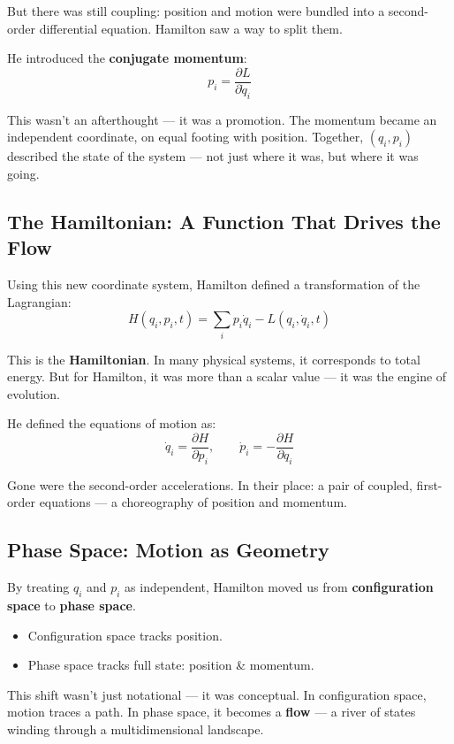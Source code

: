 But there was still coupling: position and motion were bundled into a second-order differential equation. Hamilton saw a way to split them.

He introduced the \textbf{conjugate momentum}:
\[
p_i = \frac{\partial L}{\partial \dot{q}_i}
\]

This wasn’t an afterthought — it was a promotion. The momentum became an independent coordinate, on equal footing with position.  
Together, \( (q_i, p_i) \) described the state of the system — not just where it was, but where it was going.

\subsection{The Hamiltonian: A Function That Drives the Flow}

Using this new coordinate system, Hamilton defined a transformation of the Lagrangian:
\[
H(q_i, p_i, t) = \sum_i p_i \dot{q}_i - L(q_i, \dot{q}_i, t)
\]

This is the \textbf{Hamiltonian}. In many physical systems, it corresponds to total energy.  
But for Hamilton, it was more than a scalar value — it was the engine of evolution.

He defined the equations of motion as:
\[
\dot{q}_i = \frac{\partial H}{\partial p_i}, \qquad \dot{p}_i = -\frac{\partial H}{\partial q_i}
\]

Gone were the second-order accelerations.  
In their place: a pair of coupled, first-order equations — a choreography of position and momentum.

\subsection{Phase Space: Motion as Geometry}

By treating \( q_i \) and \( p_i \) as independent, Hamilton moved us from \textbf{configuration space} to \textbf{phase space}.

\begin{itemize}
    \item Configuration space tracks position.
    \item Phase space tracks full state: position \& momentum.
\end{itemize}

This shift wasn’t just notational — it was conceptual. In configuration space, motion traces a path.  
In phase space, it becomes a \textbf{flow} — a river of states winding through a multidimensional landscape.

